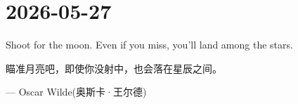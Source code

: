 \section*{2026-05-27}
Shoot for the moon. Even if you miss, you'll land among the stars. \par
瞄准月亮吧，即使你没射中，也会落在星辰之间。\par
\hfill --- Oscar Wilde(奥斯卡·王尔德) \par
